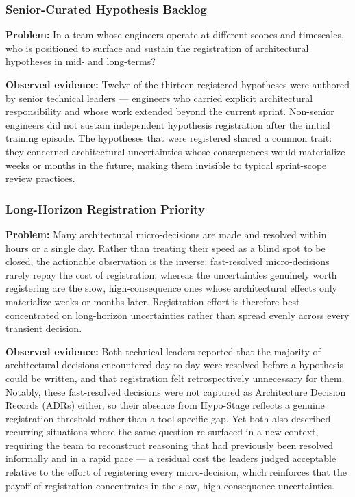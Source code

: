 \subsubsection{Senior-Curated Hypothesis Backlog}
\label{subsubsec:pattern-a1}

\textbf{Problem:} In a team whose engineers operate at different scopes and
timescales, who is positioned to surface and sustain the registration of 
architectural hypotheses in mid- and long-terms?

\textbf{Observed evidence:} Twelve of the thirteen registered hypotheses were
authored by senior technical leaders — engineers who carried explicit
architectural responsibility and whose work extended beyond the current
sprint. Non-senior engineers did not sustain independent hypothesis registration
after the initial training episode. The hypotheses that were registered shared
a common trait: they concerned architectural uncertainties whose consequences would materialize
weeks or months in the future, making them invisible to typical sprint-scope
review practices.

\subsubsection{Long-Horizon Registration Priority}
\label{subsubsec:pattern-a2}

\textbf{Problem:} Many architectural micro-decisions are made and resolved within
hours or a single day. Rather than treating their speed as a blind spot to be
closed, the actionable observation is the inverse: fast-resolved micro-decisions
rarely repay the cost of registration, whereas the uncertainties genuinely worth
registering are the slow, high-consequence ones whose architectural effects only
materialize weeks or months later. Registration effort is therefore best
concentrated on long-horizon uncertainties rather than spread evenly across every
transient decision.

\textbf{Observed evidence:} Both technical leaders reported that the majority of
architectural decisions encountered day-to-day were resolved before a hypothesis
could be written, and that registration felt retrospectively unnecessary for them.
Notably, these fast-resolved decisions were not captured as Architecture Decision
Records (ADRs) either, so their absence from Hypo-Stage reflects a genuine
registration threshold rather than a tool-specific gap. Yet both also described
recurring situations where the same question re-surfaced in a new context,
requiring the team to reconstruct reasoning that had previously been resolved
informally and in a rapid pace --- a residual cost the leaders judged acceptable
relative to the effort of registering every micro-decision, which reinforces that
the payoff of registration concentrates in the slow, high-consequence uncertainties.

